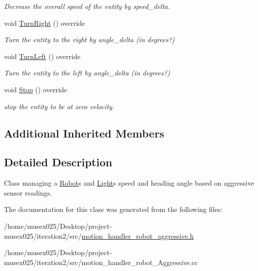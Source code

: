 \begin{DoxyCompactItemize}
\begin{DoxyCompactList}\small\item\em Decrease the overall speed of the entity by speed\+\_\+delta. \end{DoxyCompactList}\item 
void \hyperlink{classMotionHandlerRobotAggressive_a848029187d0e50d64a2a1b91a0f7c541}{Turn\+Right} () override\hypertarget{classMotionHandlerRobotAggressive_a848029187d0e50d64a2a1b91a0f7c541}{}\label{classMotionHandlerRobotAggressive_a848029187d0e50d64a2a1b91a0f7c541}

\begin{DoxyCompactList}\small\item\em Turn the entity to the right by angle\+\_\+delta (in degrees?) \end{DoxyCompactList}\item 
void \hyperlink{classMotionHandlerRobotAggressive_a67f0e31a85f979273896433ddfb38a61}{Turn\+Left} () override\hypertarget{classMotionHandlerRobotAggressive_a67f0e31a85f979273896433ddfb38a61}{}\label{classMotionHandlerRobotAggressive_a67f0e31a85f979273896433ddfb38a61}

\begin{DoxyCompactList}\small\item\em Turn the entity to the left by angle\+\_\+delta (in degrees?) \end{DoxyCompactList}\item 
void \hyperlink{classMotionHandlerRobotAggressive_a8c4e7489817fb53fda12a17bc044d76b}{Stop} () override\hypertarget{classMotionHandlerRobotAggressive_a8c4e7489817fb53fda12a17bc044d76b}{}\label{classMotionHandlerRobotAggressive_a8c4e7489817fb53fda12a17bc044d76b}

\begin{DoxyCompactList}\small\item\em stop the entity to be at zero velocity. \end{DoxyCompactList}\end{DoxyCompactItemize}
\subsection*{Additional Inherited Members}


\subsection{Detailed Description}
Class managing a \hyperlink{classRobot}{Robot}\textquotesingle{}s and \hyperlink{classLight}{Light}\textquotesingle{}s speed and heading angle based on aggressive sensor readings. 

The documentation for this class was generated from the following files\+:\begin{DoxyCompactItemize}
\item 
/home/musex025/\+Desktop/project-\/musex025/iteration2/src/\hyperlink{motion__handler__robot__aggressive_8h}{motion\+\_\+handler\+\_\+robot\+\_\+aggressive.\+h}\item 
/home/musex025/\+Desktop/project-\/musex025/iteration2/src/motion\+\_\+handler\+\_\+robot\+\_\+\+Aggressive.\+cc\end{DoxyCompactItemize}
